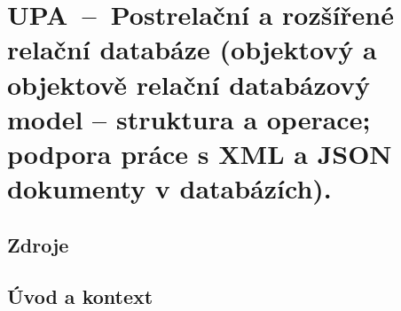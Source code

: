 

\graphicspath{{upa/postrelacni_a_rozsirene_relacni/figures}}


\chapter{UPA~--~Postrelační a rozšířené relační databáze (objektový a objektově relační databázový model -- struktura a operace; podpora práce s XML a JSON dokumenty v databázích).}


\section{Zdroje}

\begin{compactitem}
    \item {}
\end{compactitem}


\section{Úvod a kontext}

